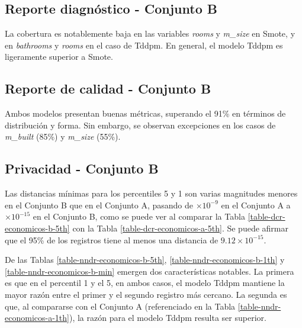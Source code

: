 

\newpage
\subsection{Reporte diagnóstico - Conjunto B}
\label{diagnostico-conjunto-b}
La cobertura es notablemente baja en las variables \emph{rooms} y \emph{m\_size} en Smote, y en \emph{bathrooms} y \emph{rooms} en el caso de Tddpm. En general, el modelo Tddpm es ligeramente superior a Smote.



\newpage
\subsection{Reporte de calidad - Conjunto B}
\label{calidad-conjunto-b}
Ambos modelos presentan buenas métricas, superando el 91\% en términos de distribución y forma. Sin embargo, se observan excepciones en los casos de \emph{m\_built} (85\%) y \emph{m\_size} (55\%).


\newpage
\subsection{Privacidad - Conjunto B}
\label{privacidad-conjunto-b}
Las distancias mínimas para los percentiles 5 y 1 son varias magnitudes menores en el Conjunto B que en el Conjunto A, pasando de $\times 10^{-9}$ en el Conjunto A a $\times 10^{-15}$ en el Conjunto B, como se puede ver al comparar la Tabla \ref{table-dcr-economicos-b-5th} con la Tabla \ref{table-dcr-economicos-a-5th}. Se puede afirmar que el 95\% de los registros tiene al menos una distancia de $9.12 \times 10^{-15}$.




\newpage
De las Tablas \ref{table-nndr-economicos-b-5th}, \ref{table-nndr-economicos-b-1th} y \ref{table-nndr-economicos-b-min} emergen dos características notables. La primera es que en el percentil 1 y el 5, en ambos casos, el modelo Tddpm mantiene la mayor razón entre el primer y el segundo registro más cercano. La segunda es que, al compararse con el Conjunto A (referenciado en la Tabla \ref{table-nndr-economicos-a-1th}), la razón para el modelo Tddpm resulta ser superior.



\newpage
